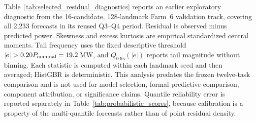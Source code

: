 {\color{blue}Table~\ref{tab:selected_residual_diagnostics} reports an earlier exploratory diagnostic from the 16-candidate, 128-landmark Farm~6 validation track, covering all 2,233 forecasts in its reused Q3--Q4 period. Residual is observed minus predicted power. Skewness and excess kurtosis are empirical standardized central moments. Tail frequency uses the fixed descriptive threshold $|e|>0.20P_{\rm nominal}=19.2$\,MW, and $Q_{0.95}(|e|)$ reports tail magnitude without binning. Each statistic is computed within each landmark seed and then averaged; HistGBR is deterministic. This analysis predates the frozen twelve-task comparison and is not used for model selection, formal predictive comparison, component attribution, or significance claims. Quantile reliability error is reported separately in Table~\ref{tab:probabilistic_scores}, because calibration is a property of the multi-quantile forecasts rather than of point residual density.}

\begin{table}[pos=htbp]
\centering
\caption{\textcolor{blue}{Earlier exploratory Farm~6 residual diagnostics. Tail frequency is the percentage with absolute error above 19.2\,MW.}}
\label{tab:selected_residual_diagnostics}
{\color{blue}\small
{}}
\end{table}
